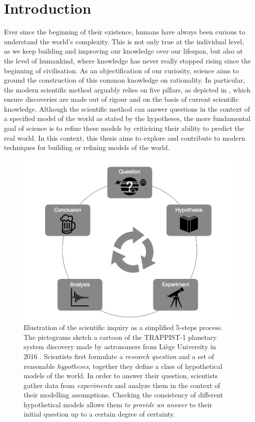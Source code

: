 \chapter{Introduction}\label{ch:introduction}
Ever since the beginning of their existence, humans have always been curious to understand the world's complexity. This is not only true at the individual level, as we keep building and improving our knowledge over our lifespan, but also at the level of humankind, where knowledge has never really stopped rising since the beginning of civilisation. As an objectification of our curiosity, science aims to ground the construction of this common knowledge on rationality. In particular, the modern scientific method arguably relies on five pillars, as depicted in , which ensure discoveries are made out of rigour and on the basis of current scientific knowledge. Although the scientific method can answer questions in the context of a specified model of the world as stated by the hypotheses, the more fundamental goal of science is to refine these models by criticising their ability to predict the real world. In this context, this thesis aims to explore and contribute to modern techniques for building or refining models of the world.

\begin{figure}[h]
  \centering
  \includegraphics[width=.8\textwidth]{figures/chapter01/trapist_disco.png}
  \caption{
  Illustration of the scientific inquiry as a simplified 5-steps process. The pictograms sketch a cartoon of the TRAPPIST-1 planetary system discovery made by astronomers from Li{\`e}ge University in 2016 \citep{gillon2017seven}.  Scientists first formulate a \textit{research question} and a set of reasonable \textit{hypotheses}, together they define a class of hypothetical models of the world. In order to answer their question, scientists gather data from \textit{experiments} and analyze them in the context of their modelling assumptions. Checking the consistency of different hypothetical models allows them \textit{to provide an answer} to their initial question up to a certain degree of certainty.}
  \label{fig:ch01:scientific_method}
\end{figure}

